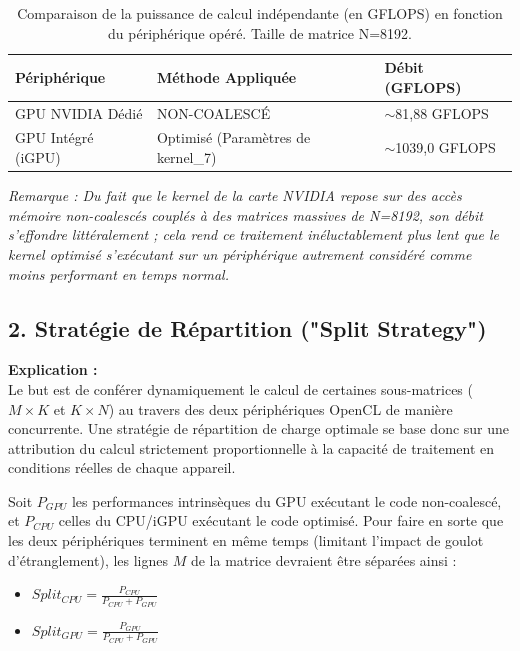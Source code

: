 \documentclass[12pt, a4paper]{article}
\begin{document}
\begin{table}[H]
    \centering
    \begin{tabular}{|l|l|l|}
        \hline
        \textbf{Périphérique} & \textbf{Méthode Appliquée} & \textbf{Débit (GFLOPS)} \\ \hline
        GPU NVIDIA Dédié & NON-COALESCÉ & $\sim$81,88 GFLOPS \\ \hline
        GPU Intégré (iGPU) & Optimisé (Paramètres de kernel\_7) & $\sim$1039,0 GFLOPS \\ \hline
    \end{tabular}
    \vspace{0.2cm}
    \caption{Comparaison de la puissance de calcul indépendante (en GFLOPS) en fonction du périphérique opéré. Taille de matrice N=8192.}
\end{table}

\textit{Remarque : Du fait que le kernel de la carte NVIDIA repose sur des accès mémoire non-coalescés couplés à des matrices massives de N=8192, son débit s'effondre littéralement ; cela rend ce traitement inéluctablement plus lent que le kernel optimisé s'exécutant sur un périphérique autrement considéré comme moins performant en temps normal.}

\subsection{2. Stratégie de Répartition ("Split Strategy")}
\textbf{Explication :} \\
Le but est de conférer dynamiquement le calcul de certaines sous-matrices ($M \times K$ et $K \times N$) au travers des deux périphériques OpenCL de manière concurrente. Une stratégie de répartition de charge optimale se base donc sur une attribution du calcul strictement proportionnelle à la capacité de traitement en conditions réelles de chaque appareil.

Soit $P_{GPU}$ les performances intrinsèques du GPU exécutant le code non-coalescé, et $P_{CPU}$ celles du CPU/iGPU exécutant le code optimisé.
Pour faire en sorte que les deux périphériques terminent en même temps (limitant l'impact de goulot d'étranglement), les lignes $M$ de la matrice devraient être séparées ainsi :
\begin{itemize}
    \item $Split_{CPU} = \frac{P_{CPU}}{P_{CPU} + P_{GPU}}$
    \item $Split_{GPU} = \frac{P_{GPU}}{P_{CPU} + P_{GPU}}$
\end{itemize}
\end{document}
